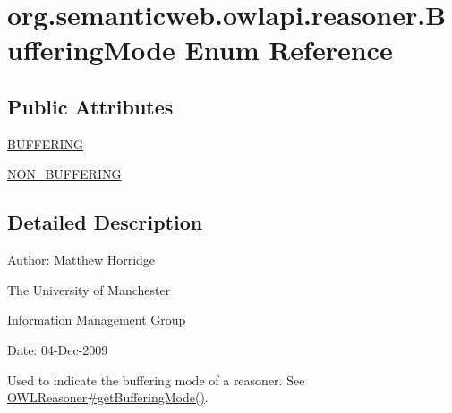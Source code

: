 \hypertarget{enumorg_1_1semanticweb_1_1owlapi_1_1reasoner_1_1_buffering_mode}{\section{org.\-semanticweb.\-owlapi.\-reasoner.\-Buffering\-Mode Enum Reference}
\label{enumorg_1_1semanticweb_1_1owlapi_1_1reasoner_1_1_buffering_mode}
}
\subsection*{Public Attributes}
\begin{DoxyCompactItemize}
\item 
\hyperlink{enumorg_1_1semanticweb_1_1owlapi_1_1reasoner_1_1_buffering_mode_afb4c0fc2e7e437308a2c0cd6223b1b02}{B\-U\-F\-F\-E\-R\-I\-N\-G}
\item 
\hyperlink{enumorg_1_1semanticweb_1_1owlapi_1_1reasoner_1_1_buffering_mode_ab07dceb7cab753a700819c0dbfabe87c}{N\-O\-N\-\_\-\-B\-U\-F\-F\-E\-R\-I\-N\-G}
\end{DoxyCompactItemize}


\subsection{Detailed Description}
Author\-: Matthew Horridge\par
 The University of Manchester\par
 Information Management Group\par
 Date\-: 04-\/\-Dec-\/2009 

Used to indicate the buffering mode of a reasoner. See \hyperlink{interfaceorg_1_1semanticweb_1_1owlapi_1_1reasoner_1_1_o_w_l_reasoner_a6a8ee6eda3b5bd2c2bb48354c1fa5d92}{O\-W\-L\-Reasoner\#get\-Buffering\-Mode()}. 

